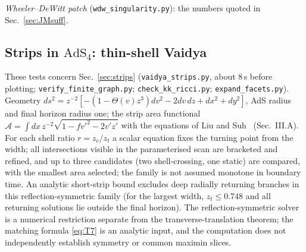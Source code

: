 \documentclass[aps,prd,onecolumn,superscriptaddress,nofootinbib,amsmath,amssymb,11pt]{revtex4-2}
\theoremstyle{definition}
\begin{document}
\emph{Wheeler--DeWitt patch} (\texttt{wdw\_singularity.py}): the numbers quoted in Sec.~\ref{sec:JMsuff}.

\subsection{Strips in $\mathrm{AdS}_4$: thin-shell Vaidya}\label{sec:numstrips}

\begin{sloppypar}
These tests concern Sec.~\ref{sec:strips} (\texttt{vaidya\_strips.py}, about 8\,s before plotting;
\texttt{verify\_finite\_graph.py}; \texttt{check\_kk\_ricci.py}; \texttt{expand\_facets.py}). Geometry
$ds^2=z^{-2}[-(1-\Theta(v)z^3)dv^2-2dv\,dz+dx^2+dy^2]$, AdS radius and final horizon radius one; the strip area functional
$\mathcal A=\int dx\,z^{-2}\sqrt{1-fv'^2-2v'z'}$ with the equations of Liu and Suh~\cite{LiuSuh2014} (Sec.~III.A). For each shell ratio
$r=z_c/z_t$ a scalar equation fixes the turning point from the width; all intersections visible in the parameterised scan are
bracketed and refined, and up to three candidates (two shell-crossing, one static) are compared, with the smallest area selected; the
family is not assumed monotone in boundary time. An analytic short-strip bound excludes deep radially returning branches in this
reflection-symmetric family (for the largest width, $z_t\le0.748$ and all returning solutions lie outside the final horizon). The
reflection-symmetric solver is a numerical restriction separate from the transverse-translation theorem; the matching formula
\eqref{eq:T7} is an analytic input, and the computation does not independently establish symmetry or common maximin slices.
\end{sloppypar}
\end{document}
